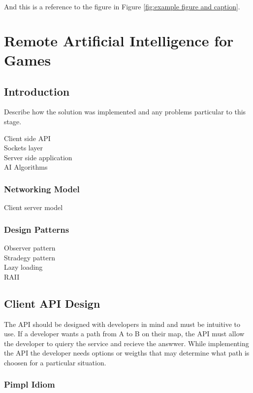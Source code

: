 \documentclass[12pt,a4paper,titlepage]{article}
\begin{document}
And this is a reference to the figure in Figure \ref{fig:example figure and caption}.


\section{Remote Artificial Intelligence for Games}

\subsection{Introduction}

Describe how the solution was implemented and any problems particular to this stage.

Client side API\\
Sockets layer\\
Server side application\\
AI Algorithms\\

\subsubsection{Networking Model}

Client server model\\

\subsubsection{Design Patterns}
Observer pattern\\
Stradegy pattern\\
Lazy loading\\
RAII\\

\subsection{Client API Design}

The API should be designed with developers in mind and must be intuitive to use. If a developer wants a path from A to B on their map, the API must allow the developer to quiery the service and recieve the answwer. While implementing the API the developer needs options or weigths that may determine what path is choosen for a particular situation. 

\subsubsection{Pimpl Idiom}
\end{document}
